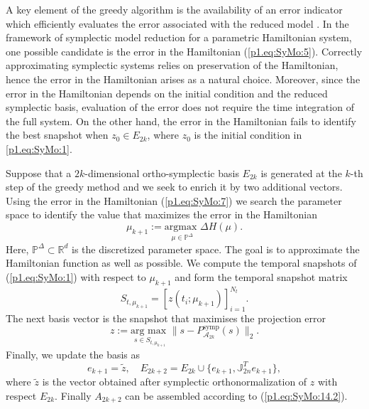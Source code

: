 A key element of the greedy algorithm is the availability of an error indicator which efficiently evaluates the error associated with the reduced model \cite{hesthaven2015certified}. In the framework of symplectic model reduction for a parametric Hamiltonian system, one possible candidate is the error in the Hamiltonian (\ref{p1.eq:SyMo:5}). Correctly approximating symplectic systems relies on preservation of the Hamiltonian, hence the error in the Hamiltonian arises as a natural choice. Moreover, since the error in the Hamiltonian depends on the initial condition and the reduced symplectic basis, evaluation of the error does not require the time integration of the full system. On the other hand, the error in the Hamiltonian fails to identify the best snapshot when $z_0\in E_{2k}$, where $z_0$ is the initial condition in \eqref{p1.eq:SyMo:1}.

Suppose that a $2k$-dimensional ortho-symplectic basis $E_{2k}$ is generated at the $k$-th step of the greedy method and we seek to enrich it by two additional vectors. Using the error in the Hamiltonian (\ref{p1.eq:SyMo:7}) we search the parameter space to identify the value that maximizes the error in the Hamiltonian
\begin{equation} \label{eq:SyMo:14.5}
	\mu_{k+1} := \underset{\mu\in \mathbb P^{\Delta}}{\text{argmax }}\Delta H(\mu).
\end{equation}
Here, $\mathbb P^{\Delta} \subset \mathbb R^{d}$ is the discretized parameter space. The goal is to approximate the Hamiltonian function as well as possible. We compute the temporal snapshots of (\ref{p1.eq:SyMo:1}) with respect to $\mu_{k+1}$ and form the temporal snapshot matrix
\begin{equation}
	S_{t,\mu_{k+1}}= [ z(t_i;\mu_{k+1}) ]_{i=1}^{N_t}.
\end{equation} 
The next basis vector is the snapshot that maximises the projection error 
\begin{equation} \label{eq:SyMo:14.6}
	z := \underset{s\in S_{t,\mu_{k+1}}}{\text{arg\ max }} \| s - P_{\mathcal A_{2k}}^{\text{symp}}(s) \|_2.
\end{equation}
Finally, we update the basis as
\begin{equation} \label{eq:SyMo:14.7}
	e_{k+1} = \tilde z, \quad E_{2k+2} = E_{2k}\cup \{ e_{k+1} , \mathbb J_{2n}^Te_{k+1} \},
\end{equation}
where $\tilde z$ is the vector obtained after symplectic orthonormalization of $z$ with respect $E_{2k}$. Finally $A_{2k+2}$ can be assembled according to (\ref{p1.eq:SyMo:14.2}).

